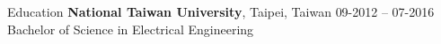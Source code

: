 \documentclass[letterpaper]{resume} %
\begin{document}


\begin{rSection}{Education}
{\bf National Taiwan University}, Taipei, Taiwan \hfill {09-2012 -- 07-2016} \\ 
Bachelor of Science in Electrical Engineering
\end{rSection}
\vspace{-0.6\baselineskip}


\end{document}

